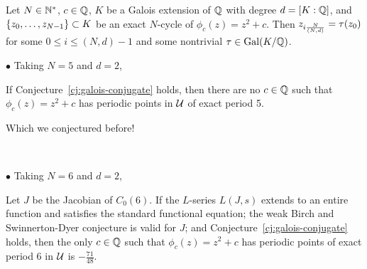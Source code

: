 \documentclass[aspectratio=1610]{beamer}
\begin{document}
\begin{frame}
  \begin{hconjecture}
    \label{cj:galois-conjugate}
    Let $N \in \mathbb{N}^*$, $c \in \mathbb{Q}$, $K$ be a Galois extension of $\mathbb{Q}$
    with degree $d = [K : \mathbb{Q}]$, and $\left\{z_0, \dots, z_{N-1}\right\} \subset
    K$ be an exact $N$-cycle of $\phi_c(z) = z^2 + c$. Then $z_{i\frac{N}{(N, d)}}
    = \tau(z_0)$ for some $0 \le i \le (N, d)-1$ and some nontrivial $\tau
    \in \mathrm{Gal}(K/\mathbb{Q})$.
  \end{hconjecture}

  \pause

  $\bullet$ Taking $N = 5$ and $d = 2$,

  \begin{hcorollary}
    If Conjecture~\ref{cj:galois-conjugate} holds, then there are no
    $c \in \mathbb{Q}$ such that $\phi_c(z) = z^2 + c$ has periodic points in
    $\mathcal{U}$ of exact period 5.
  \end{hcorollary}

  Which we conjectured before!

  \pause\

  $\bullet$ Taking $N = 6$ and $d = 2$,

  \begin{hcorollary}
    \label{cor:6-cycle}
    Let $J$ be the Jacobian of $C_0(6)$. If the $L$-series $L(J, s)$
    extends to an entire function and satisfies the standard
    functional equation; the weak Birch and Swinnerton-Dyer conjecture
    is valid for $J$; and Conjecture~\ref{cj:galois-conjugate} holds,
    then the only $c \in \mathbb{Q}$ such that $\phi_c(z) = z^2 + c$ has
    periodic points of exact period 6 in $\mathcal{U}$ is $-\frac{71}{48}$.
  \end{hcorollary}
\end{frame}

{}

\end{document}
